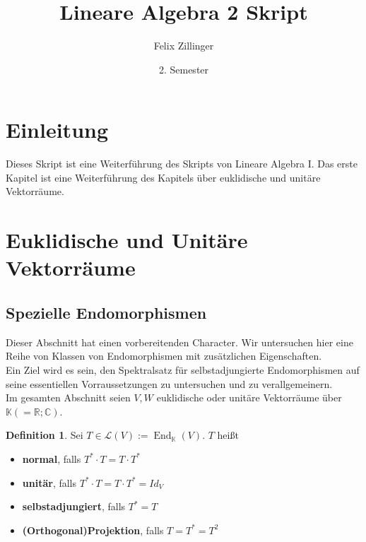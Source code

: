 \documentclass[12pt,a4paper]{article}
\author{Felix Zillinger}
\title{Lineare Algebra 2 Skript}
\date{2. Semester}
\theoremstyle{definition}
\newtheorem{definition}[theorem]{Definition}
\theoremstyle{remark}
\DeclareMathOperator{\End}{End}
\begin{document}
	\maketitle 
	\tableofcontents

	\newpage	
	
	\section*{Einleitung}
	Dieses Skript ist eine Weiterführung des Skripts von Lineare Algebra I. Das erste Kapitel ist eine Weiterführung des Kapitels über euklidische und unitäre Vektorräume.
	\section{Euklidische und Unitäre Vektorräume}
	\setcounter{subsection}{6}
	\subsection{Spezielle Endomorphismen}
	
	Dieser Abschnitt hat einen vorbereitenden Character. Wir untersuchen hier eine Reihe von Klassen von Endomorphismen mit zusätzlichen Eigenschaften. \\
	Ein Ziel wird es sein, den Spektralsatz für selbstadjungierte Endomorphismen auf seine essentiellen Vorraussetzungen zu untersuchen und zu verallgemeinern. \\
	Im gesamten Abschnitt seien $V, W$ euklidische oder unitäre Vektorräume über $\mathbb{K}(= \mathbb{R}; \mathbb{C})$. \\
	
	\begin{definition}
		Sei $T \in \mathcal{L}(V) := \End_{\mathbb{K}}(V)$. $T$ heißt \\
		\begin{itemize}
			\item \textbf{normal}, falls $T^{*} \cdot T = T \cdot T^*$
			\item \textbf{unitär}, falls $T^{*} \cdot T = T \cdot T^* = Id_V$
			\item \textbf{selbstadjungiert}, falls $T^* = T$
			\item \textbf{(Orthogonal)Projektion},  falls $T = T^* = T^2$
		\end{itemize}
	\end{definition}
	
\end{document}
